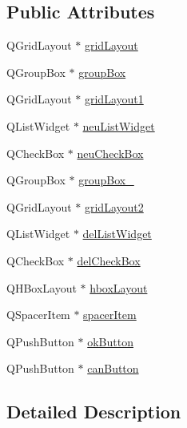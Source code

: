 \subsection*{Public Attributes}
\begin{CompactItemize}
\item 
QGridLayout $\ast$ \hyperlink{class_ui___logfile_lesen_dialog_class_4e546ee21e99638d9563869820e750c1}{gridLayout}
\item 
QGroupBox $\ast$ \hyperlink{class_ui___logfile_lesen_dialog_class_3b1c8005dc5516081b6d0a7c54faa174}{groupBox}
\item 
QGridLayout $\ast$ \hyperlink{class_ui___logfile_lesen_dialog_class_efe6e079783a98274b2e71acce997ead}{gridLayout1}
\item 
QListWidget $\ast$ \hyperlink{class_ui___logfile_lesen_dialog_class_15ff7916c3a250b110f3a8d735af5f1e}{neuListWidget}
\item 
QCheckBox $\ast$ \hyperlink{class_ui___logfile_lesen_dialog_class_83b2e113dea069bc1585100075685770}{neuCheckBox}
\item 
QGroupBox $\ast$ \hyperlink{class_ui___logfile_lesen_dialog_class_d527f4d0db097301320a301ba11dc14f}{groupBox\_}
\item 
QGridLayout $\ast$ \hyperlink{class_ui___logfile_lesen_dialog_class_1bd0e843db42a19bc5c3729bafa669cb}{gridLayout2}
\item 
QListWidget $\ast$ \hyperlink{class_ui___logfile_lesen_dialog_class_98e3d83577b746e629aaac0dfeda5b3e}{delListWidget}
\item 
QCheckBox $\ast$ \hyperlink{class_ui___logfile_lesen_dialog_class_3410e297816a8fe3b7efd3fcecd1aa0f}{delCheckBox}
\item 
QHBoxLayout $\ast$ \hyperlink{class_ui___logfile_lesen_dialog_class_845b8b80a40fa27a6ea93a4b30252f37}{hboxLayout}
\item 
QSpacerItem $\ast$ \hyperlink{class_ui___logfile_lesen_dialog_class_29736c08cc200a0aad75cab45b7828cd}{spacerItem}
\item 
QPushButton $\ast$ \hyperlink{class_ui___logfile_lesen_dialog_class_3ddb758f07a4c58549b78331cc8b52ad}{okButton}
\item 
QPushButton $\ast$ \hyperlink{class_ui___logfile_lesen_dialog_class_f9ffc044295598b1ba015b0256eaf072}{canButton}
\end{CompactItemize}


\subsection{Detailed Description}


